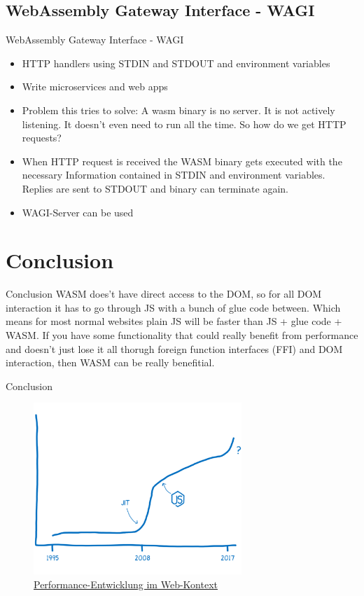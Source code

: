\documentclass{beamer}
\begin{document}
\subsection{WebAssembly Gateway Interface - WAGI}
\begin{frame}{WebAssembly Gateway Interface - WAGI}
    \begin{itemize}
        \item HTTP handlers using STDIN and STDOUT and environment variables
        \item Write microservices and web apps
        \item Problem this tries to solve: A wasm binary is no server. It is not actively listening. It doesn't even need to run all the time. So how do we get HTTP requests?
        \item When HTTP request is received the WASM binary gets executed with the necessary Information contained in STDIN and environment variables. Replies are sent to STDOUT and binary can terminate again.
        \item WAGI-Server can be used
    \end{itemize}
\end{frame}

\section{Conclusion}

\begin{frame}{Conclusion}
WASM does't have direct access to the DOM, so for all DOM interaction it has to go through JS with a bunch of glue code between. Which means for most normal websites plain JS will be faster than JS + glue code + WASM. If you have some functionality that could really benefit from performance and doesn't just lose it all thorugh foreign function interfaces (FFI) and DOM interaction, then WASM can be really benefitial.
\end{frame}

\begin{frame}{Conclusion}
    \begin{figure}
        \includegraphics[width=0.7\textwidth,height=0.7\textheight]{./images/perf_history.png}
        \caption{\href{https://hacks.mozilla.org/2017/02/a-cartoon-intro-to-webassembly/}{Performance-Entwicklung im Web-Kontext}}
    \end{figure}
\end{frame}
\end{document}
